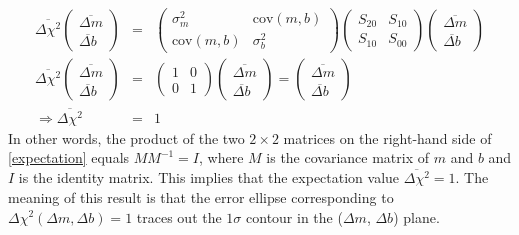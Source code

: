 \documentclass{article}
\begin{document}
\begin{eqnarray}
  \overline{ \Delta \chi^2 } \left(\begin{array}{c} \overline{\Delta m} \\ \overline{\Delta b} \end{array}\right) &=& \left(  \begin{array}{cc} \sigma_m^2 & \mbox{cov}(m,b) \\ \mbox{cov}(m,b) & \sigma_b^2 \end{array} \right) \left(\begin{array}{cc} S_{20} & S_{10} \\ S_{10} & S_{00} \end{array}\right)\left(\begin{array}{c} \overline{\Delta m} \\ \overline{\Delta b} \end{array}\right)  \label{expectation} \\
  \overline{\Delta \chi^2} \left(\begin{array}{c} \overline{\Delta m} \\ \overline{\Delta b} \end{array}\right) &=& \left(\begin{array}{cc} 1 & 0 \\ 0 & 1 \end{array}\right) \left(\begin{array}{c} \overline{\Delta m} \\ \overline{\Delta b} \end{array}\right)  = \left(\begin{array}{c} \overline{\Delta m} \\ \overline{\Delta b} \end{array}\right) \\
  \Rightarrow \overline{\Delta \chi^2} &=& 1
\end{eqnarray} 
In other words, the product of the two $2 \times 2$ matrices on the right-hand side of \eqref{expectation} equals $M M^{-1} = I$, where $M$ is the covariance matrix of $m$ and $b$ and $I$ is the identity matrix. This implies that the expectation value $\overline{\Delta \chi^2} = 1$. The meaning of this result is that the error ellipse corresponding to $\Delta \chi^2(\Delta m, \Delta b) = 1$ traces out the $1\sigma$ contour in the ($\Delta m$, $\Delta b$) plane. 
\end{document}
